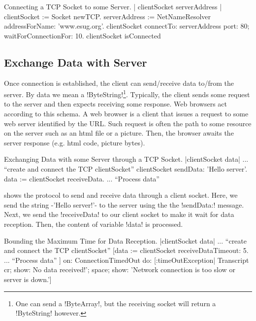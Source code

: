 \documentclass[a4paper,10pt,twoside]{book}
\begin{document}
\begin{script}[connectingTcpSocket]{Connecting a TCP Socket to some Server.}
| clientSocket serverAddress |
clientSocket := Socket newTCP.
serverAddress := NetNameResolver addressForName: 'www.esug.org'.
clientSocket 
	connectTo: serverAddress port: 80;
	waitForConnectionFor: 10.
clientSocket isConnected
\end{script}

\subsection{Exchange Data with Server}
Once connection is established, the client can send/receive data to/from the server.
By data we mean a \ct!ByteString!\footnote{One can send a \ct!ByteArray!, but the receiving socket will return a \ct!ByteString! however.}.
Typically, the client sends some request to the server and then expects receiving some response.
Web browsers act according to this schema.
A web browser is a client that issues a request to some web server identified by the URL.
Such request is often the path to some resource on the server such as an html file or a picture.
Then, the browser awaits the server response (e.g. html code, picture bytes).

\begin{script}[dataExhangeWithTcpSocket]{Exchanging Data with some Server through a TCP Socket.}
|clientSocket data|
... ``create and connect the TCP clientSocket''
clientSocket sendData: 'Hello server'.
data := clientSocket receiveData.
... ``Process data''
\end{script}

 shows the protocol to send and receive data through a client socket.
Here, we send the string \ct-'Hello server!'- to the server using the the \ct!sendData:! message.
Next, we send the \ct!receiveData! to our client socket to make it wait for data reception.
Then, the content of variable \ct!data! is processed.

\begin{script}[dataReceptionTimeOut]{Bounding the Maximum Time for Data Reception.}
|clientSocket data|
... ``create and connect the TCP clientSocket''
[data := clientSocket receiveDataTimeout: 5.
... ``Process data''
] on: ConnectionTimedOut 
do: [:timeOutException|
	Transcript 
		cr; 
		show: No data received!';
		space;
		show: 'Network connection is too slow or server is down.']
\end{script}
\end{document}
